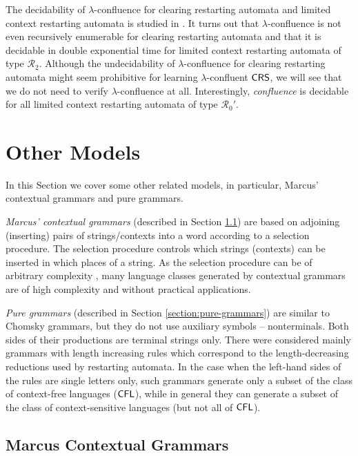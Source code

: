 The decidability of $\lambda$-confluence for clearing restarting automata and limited context restarting automata is studied in \cite{OM15}. It turns out that $\lambda$-confluence is not even recursively enumerable for clearing restarting automata and that it is decidable in double exponential time for limited context restarting automata of type $\mathcal{R}_2$. Although the undecidability of $\lambda$-confluence for clearing restarting automata might seem prohibitive for learning $\lambda$-confluent $\textup{\sf CRS\/}$, we will see that we do not need to verify $\lambda$-confluence at all. Interestingly, \emph{confluence} is decidable for all limited context restarting automata of type $\mathcal{R}_0'$. 

\section{Other Models}
\label{section:other-models}

In this Section we cover some other related models, in particular, Marcus' contextual grammars and pure grammars.

\emph{Marcus' contextual grammars} (described in Section \ref{section:marcus-contextual-grammars}) are based on adjoining (inserting) pairs of strings/contexts into a word according to a selection procedure. The selection procedure controls which strings (contexts) can be inserted in which places of a string. As the selection procedure can be of arbitrary complexity \cite{Pa98}, many language classes generated by contextual grammars are of high complexity and without practical applications.

\emph{Pure grammars} \cite{maurer1980pure} (described in Section \ref{section:pure-grammars}) are similar to Chomsky grammars, but they do not use auxiliary symbols -- nonterminals. Both sides of their productions are terminal strings only. There were considered mainly grammars with length increasing rules which correspond to the length-decreasing reductions used by restarting automata. In the case when the left-hand sides of the rules are single letters only, such grammars generate only a subset of the class of context-free languages ($\textup{\sf CFL}$), while in general they can generate a subset of the class of context-sensitive languages (but not all of $\textup{\sf CFL}$).

\subsection{Marcus Contextual Grammars}
\label{section:marcus-contextual-grammars}

